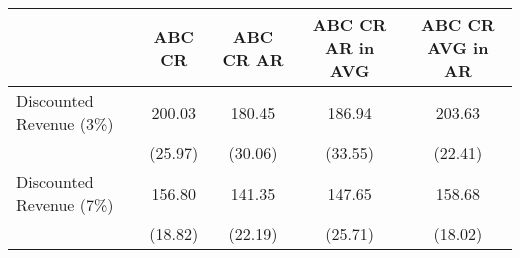 \begin{tabular}{l*{4}{c}}
\hline\hline
                    &      ABC CR&   ABC CR AR&ABC CR AR in AVG&ABC CR AVG in AR\\
\hline
Discounted Revenue (3\%)&      200.03&      180.45&      186.94&      203.63\\
                    &     (25.97)&     (30.06)&     (33.55)&     (22.41)\\
Discounted Revenue (7\%)&      156.80&      141.35&      147.65&      158.68\\
                    &     (18.82)&     (22.19)&     (25.71)&     (18.02)\\
\hline\hline
\end{tabular}
